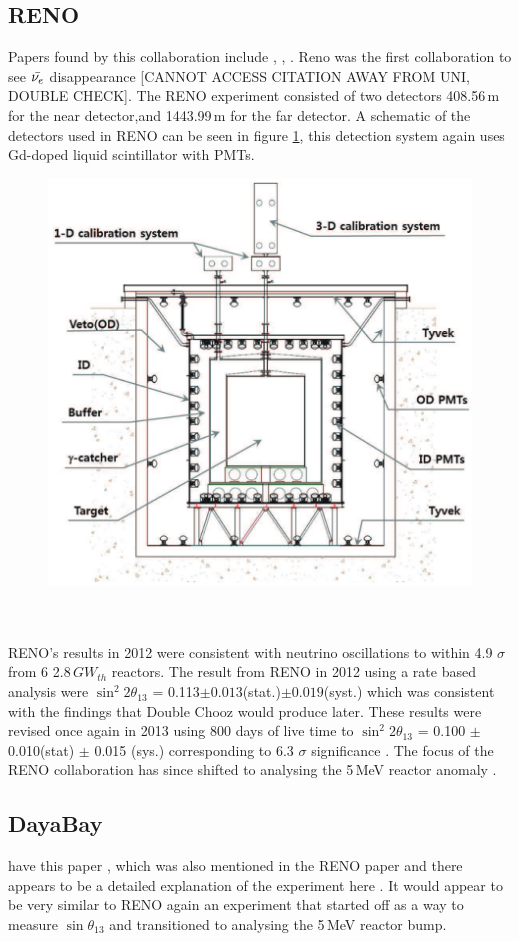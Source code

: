 \subsection{RENO}
Papers found by this collaboration include \cite{reno_may_2012}, \cite{reno2013},  \cite{reno_may_2019}. Reno was the first collaboration to see $\Bar{\nu_e}$ disappearance \cite{Olive_2014} [CANNOT ACCESS CITATION AWAY FROM UNI, DOUBLE CHECK]. The RENO experiment consisted of two detectors 408.56\,m for the near detector,and 1443.99\,m for the far detector. A schematic of the detectors used in RENO can be seen in figure \ref{RENO_detector}, this detection system again uses Gd-doped liquid scintillator with PMTs. 
\begin{figure}[htbp]
 \centering
 \includegraphics[width=0.5\linewidth]{Chapter2/Figs/Raster/RENO_detector.png} %
 \label{RENO_detector}
\end{figure}
\\\\RENO's results in 2012 were consistent with neutrino oscillations to within 4.9 $\sigma$ from 6 2.8\,$GW_{th}$ reactors. The result from RENO in 2012 using a rate based analysis were $\sin^2{2\theta_{13}}$ = 0.113$\pm0.013$(stat.)$\pm0.019$(syst.) which was consistent with the findings that Double Chooz would produce later. These results were revised once again in 2013 using 800 days of live time to $\sin^2{2\theta_{13}}$ = 0.100 $\pm$ 0.010(stat) $\pm$ 0.015 (sys.) corresponding to 6.3 $\sigma$ significance \cite{reno2013}. The focus of the RENO collaboration has since shifted to analysing the 5\,MeV reactor anomaly \cite{reno_may_2019}.  
\subsection{DayaBay}
have this paper \cite{Daya_Bay_2017}, which was also mentioned in the RENO paper \cite{reno_may_2019} and there appears to be a detailed explanation of the experiment here \cite{DayaBay2007Precision}. It would appear to be very similar to RENO again an experiment that started off as a way to measure $\sin{\theta_{13}}$ and transitioned to analysing the 5\,MeV reactor bump.
